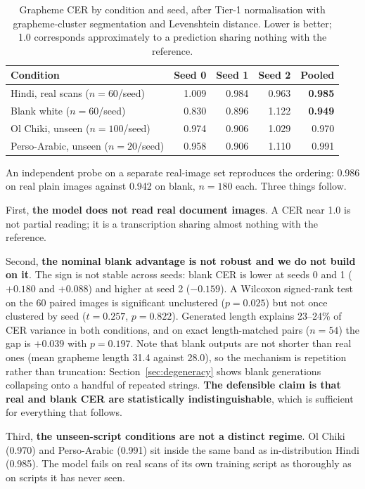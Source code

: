 \documentclass{article}
\begin{document}
\begin{table}[h]
\small
\centering
\caption{Grapheme CER by condition and seed, after Tier-1 normalisation with grapheme-cluster
segmentation and Levenshtein distance. Lower is better; 1.0 corresponds approximately to a
prediction sharing nothing with the reference.}
\label{tab:cer}
\begin{tabular}{lrrrr}
\toprule
Condition & Seed 0 & Seed 1 & Seed 2 & Pooled \\
\midrule
Hindi, real scans ($n=60$/seed)    & 1.009 & 0.984 & 0.963 & \textbf{0.985} \\
Blank white ($n=60$/seed)          & 0.830 & 0.896 & 1.122 & \textbf{0.949} \\
Ol Chiki, unseen ($n=100$/seed)    & 0.974 & 0.906 & 1.029 & 0.970 \\
Perso-Arabic, unseen ($n=20$/seed) & 0.958 & 0.906 & 1.110 & 0.991 \\
\bottomrule
\end{tabular}
\end{table}

An independent probe on a separate real-image set reproduces the ordering: 0.986 on real plain
images against 0.942 on blank, $n=180$ each. Three things follow.

First, \textbf{the model does not read real document images}. A CER near 1.0 is not partial
reading; it is a transcription sharing almost nothing with the reference.

Second, \textbf{the nominal blank advantage is not robust and we do not build on it}. The
sign is not stable across seeds: blank CER is lower at seeds 0 and 1 ($+0.180$ and $+0.088$)
and higher at seed 2 ($-0.159$). A Wilcoxon signed-rank test on the 60 paired images is
significant unclustered ($p = 0.025$) but not once clustered by seed
($t = 0.257$, $p = 0.822$). Generated length explains 23--24\% of CER variance in both
conditions, and on exact length-matched pairs ($n = 54$) the gap is $+0.039$ with
$p = 0.197$. Note that blank outputs are not shorter than real ones (mean grapheme length
31.4 against 28.0), so the mechanism is repetition rather than truncation:
Section~\ref{sec:degeneracy} shows blank generations collapsing onto a handful of repeated
strings. \textbf{The defensible claim is that real and blank CER are statistically
indistinguishable}, which is sufficient for everything that follows.

Third, \textbf{the unseen-script conditions are not a distinct regime}. Ol Chiki (0.970) and
Perso-Arabic (0.991) sit inside the same band as in-distribution Hindi (0.985). The model
fails on real scans of its own training script as thoroughly as on scripts it has never seen.
\end{document}
